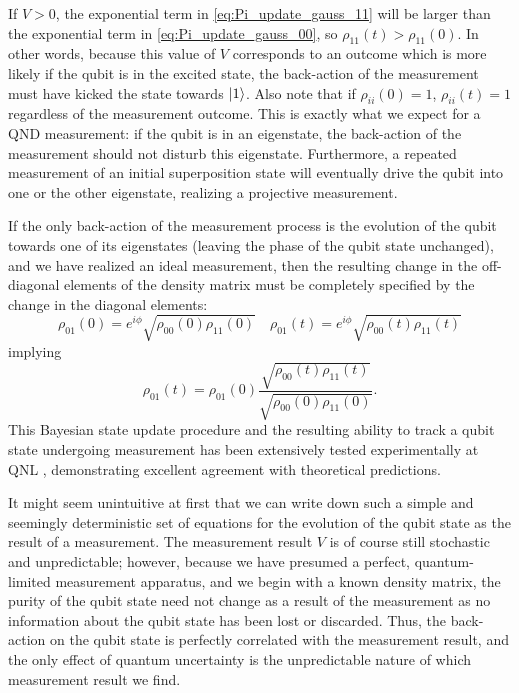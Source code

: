 If $V>0$, the exponential term in \eqref{eq:Pi_update_gauss_11} will be larger than the exponential term in \eqref{eq:Pi_update_gauss_00}, so $\rho_{11}(t) > \rho_{11}(0)$.  In other words, because this value of $V$ corresponds to an outcome which is more likely if the qubit is in the excited state, the back-action of the measurement must have kicked the state towards $|1\rangle$.  Also note that if $\rho_{ii}(0) = 1$, $\rho_{ii}(t) = 1$ regardless of the measurement outcome.  This is exactly what we expect for a QND measurement: if the qubit is in an eigenstate, the back-action of the measurement should not disturb this eigenstate.  Furthermore, a repeated measurement of an initial superposition state will eventually drive the qubit into one or the other eigenstate, realizing a projective measurement.

If the only back-action of the measurement process is the evolution of the qubit towards one of its eigenstates (leaving the phase of the qubit state unchanged), and we have realized an ideal measurement, then the resulting change in the off-diagonal elements of the density matrix must be completely specified by the change in the diagonal elements:
\begin{equation}
\rho_{01}(0) = e^{i\phi} \sqrt{\rho_{00}(0) \rho_{11}(0)} \quad \rho_{01}(t) = e^{i \phi} \sqrt{\rho_{00}(t) \rho_{11}(t)} 
\end{equation}
implying
\begin{equation}
\rho_{01}(t) = \rho_{01}(0) \frac{ \sqrt{ \rho_{00}(t) \rho_{11}(t)} } { \sqrt{ \rho_{00}(0) \rho_{11}(0)} }.
\label{eq:rho01_update}
\end{equation}
This Bayesian state update procedure and the resulting ability to track a qubit state undergoing measurement has been extensively tested experimentally at QNL \cite{Weber2014,murch_observing_2013,Weber2014a}, demonstrating excellent agreement with theoretical predictions.

It might seem unintuitive at first that we can write down such a simple and seemingly deterministic set of equations for the evolution of the qubit state as the result of a measurement.  The measurement result $V$ is of course still stochastic and unpredictable; however, because we have presumed a perfect, quantum-limited measurement apparatus, and we begin with a known density matrix, the purity of the qubit state need not change as a result of the measurement as no information about the qubit state has been lost or discarded.  Thus, the back-action on the qubit state is perfectly correlated with the measurement result, and the only effect of quantum uncertainty is the unpredictable nature of which measurement result we find.


